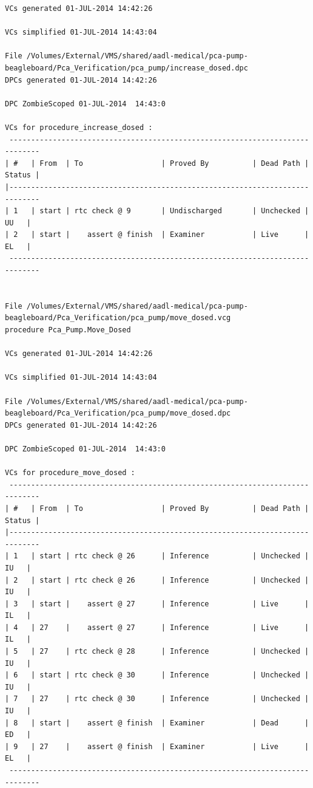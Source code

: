 \begin{lstlisting}[frame=single, gobble=0, caption={POGS report}]
VCs generated 01-JUL-2014 14:42:26

VCs simplified 01-JUL-2014 14:43:04

File /Volumes/External/VMS/shared/aadl-medical/pca-pump-beagleboard/Pca_Verification/pca_pump/increase_dosed.dpc
DPCs generated 01-JUL-2014 14:42:26

DPC ZombieScoped 01-JUL-2014  14:43:0

VCs for procedure_increase_dosed :
 -----------------------------------------------------------------------------
| #   | From  | To                  | Proved By          | Dead Path | Status |
|-----------------------------------------------------------------------------
| 1   | start | rtc check @ 9       | Undischarged       | Unchecked |   UU   |
| 2   | start |    assert @ finish  | Examiner           | Live      |   EL   |
 -----------------------------------------------------------------------------


File /Volumes/External/VMS/shared/aadl-medical/pca-pump-beagleboard/Pca_Verification/pca_pump/move_dosed.vcg
procedure Pca_Pump.Move_Dosed

VCs generated 01-JUL-2014 14:42:26

VCs simplified 01-JUL-2014 14:43:04

File /Volumes/External/VMS/shared/aadl-medical/pca-pump-beagleboard/Pca_Verification/pca_pump/move_dosed.dpc
DPCs generated 01-JUL-2014 14:42:26

DPC ZombieScoped 01-JUL-2014  14:43:0

VCs for procedure_move_dosed :
 -----------------------------------------------------------------------------
| #   | From  | To                  | Proved By          | Dead Path | Status |
|-----------------------------------------------------------------------------
| 1   | start | rtc check @ 26      | Inference          | Unchecked |   IU   |
| 2   | start | rtc check @ 26      | Inference          | Unchecked |   IU   |
| 3   | start |    assert @ 27      | Inference          | Live      |   IL   |
| 4   | 27    |    assert @ 27      | Inference          | Live      |   IL   |
| 5   | 27    | rtc check @ 28      | Inference          | Unchecked |   IU   |
| 6   | start | rtc check @ 30      | Inference          | Unchecked |   IU   |
| 7   | 27    | rtc check @ 30      | Inference          | Unchecked |   IU   |
| 8   | start |    assert @ finish  | Examiner           | Dead      |   ED   |
| 9   | 27    |    assert @ finish  | Examiner           | Live      |   EL   |
 -----------------------------------------------------------------------------



\end{lstlisting}
